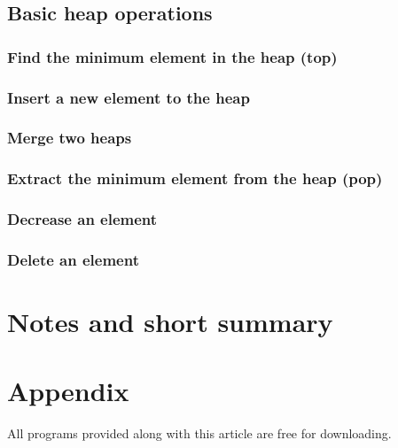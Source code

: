 \documentclass{article}
\begin{document}
\subsection{Basic heap operations}

\subsubsection{Find the minimum element in the heap (top)}

\subsubsection{Insert a new element to the heap}

\subsubsection{Merge two heaps}

\subsubsection{Extract the minimum element from the heap (pop)}

\subsubsection{Decrease an element}

\subsubsection{Delete an element}

\section{Notes and short summary}

\section{Appendix} \label{appendix}
All programs provided along with this article are free for
downloading.
\end{document}
